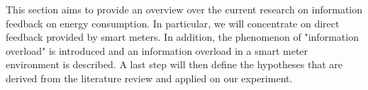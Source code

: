 %
%

% 

This section aims to provide an overview over the current research on information feedback on energy consumption. In particular, we will concentrate on direct feedback provided by smart meters. In addition, the phenomenon of "information overload" is introduced and an information overload in a smart meter environment is described. A last step will then define the hypotheses that are derived from the literature review and applied on our experiment.


